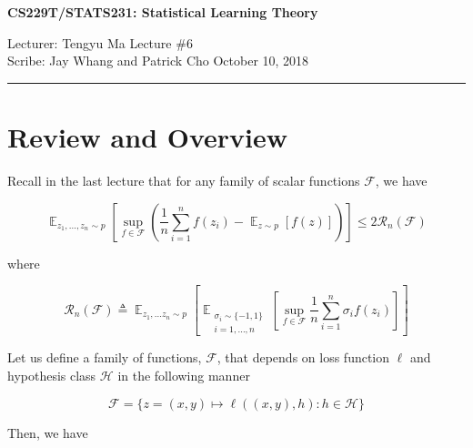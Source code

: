 \documentclass[11pt]{article}
\newcommand{\draftnotice}{\vbox to 0.25in{\noindent
   \raisebox{0.6in}[0in][0in]{\makebox[\textwidth][r]{\it
    DRAFT --- a final version will be posted shortly}}}
   \vspace{-.25in}\vspace{-\baselineskip}
}
\DeclareMathOperator*{\E}{\mathbb{E}}
\begin{document}
\thispagestyle{empty}


\begin{center}
\bf\large CS229T/STATS231: Statistical Learning Theory
\end{center}

\noindent
Lecturer: Tengyu Ma   %
\hfill
Lecture \#6               %
\\
Scribe: Jay Whang and Patrick Cho                  %
\hfill
October 10, 2018           %

\noindent
\rule{\textwidth}{1pt}

\medskip


\section{Review and Overview}

Recall in the last lecture that for any family of scalar functions $\mathcal{F}$, we have
	
\begin{equation}  \label{eq:1}
\E_{z_1,...,z_n \sim p} \left[ \sup_{f\in \mathcal{F}} \left( \frac{1}{n} \sum_{i=1}^n f(z_i) - \E_{z \sim p}[f(z)] \right) \right] \leq 2\mathcal{R}_n(\mathcal{F}) 
\end{equation}

where

\begin{equation}
\mathcal{R}_n(\mathcal{F}) \triangleq \E_{z_1,...z_n \sim p} \left[ \E_{\substack{\sigma_i \sim \{-1,1\}\\i=1,...,n}} \left[ \sup_{f \in \mathcal{F}} \frac{1}{n} \sum_{i=1}^n \sigma_i f(z_i) \right] \right]
\end{equation}

Let us define a family of functions, $\mathcal{F}$, that depends on loss function $\ell$ and hypothesis class $\mathcal{H}$ in the following manner

\begin{equation}  \label{eq:3}
\mathcal{F} = \{ z=(x,y) \mapsto \ell((x,y),h) : h \in \mathcal{H} \}
\end{equation}

Then, we have
\end{document}
